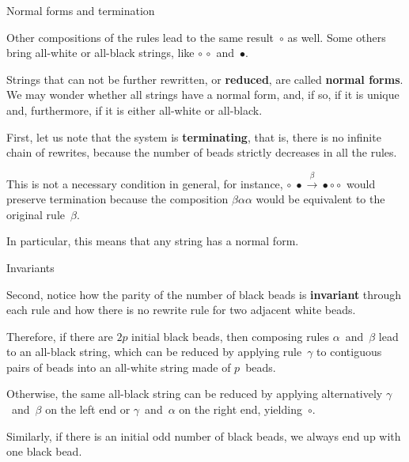 %
\begin{frame}{Normal forms and termination}

  \label{termination1}

  Other compositions of the rules lead to the same result~\(\circ\) as
  well. Some others bring all\hyp{}white or all\hyp{}black strings,
  like \(\circ \, \circ\) and~\(\bullet\).

  \bigskip

  Strings that can not be further rewritten, or \textbf{reduced}, are
  called \textbf{normal forms}. We may wonder whether all strings have
  a normal form, and, if so, if it is unique and, furthermore, if it
  is either all\hyp{}white or all\hyp{}black.

  \bigskip

  First, let us note that the system is \textbf{terminating}, that is,
  there is no infinite chain of rewrites, because the number of beads
  strictly decreases in all the rules.

  \bigskip

  This is not a necessary condition in general, for instance, \(\circ
  \; \bullet \xrightarrow{\beta} \bullet \circ \circ\) would preserve
  termination because the composition \(\beta\alpha\alpha\) would be
  equivalent to the original rule~\(\beta\).

  \bigskip

  In particular, this means that any string has a normal form.

\end{frame}

%
\begin{frame}{Invariants}

  Second, notice how the parity of the number of black beads is
  \textbf{invariant} through each rule and how there is no rewrite
  rule for two adjacent white beads.

  \bigskip

  Therefore, if there are \(2p\) initial black beads, then composing
  rules \(\alpha\)~and~\(\beta\) lead to an all\hyp{}black string,
  which can be reduced by applying rule~\(\gamma\) to contiguous pairs
  of beads into an all\hyp{}white string made of \(p\)~beads.

  \bigskip

  Otherwise, the same all\hyp{}black string can be reduced by applying
  alternatively \(\gamma\)~and~\(\beta\) on the left end or
  \(\gamma\)~and~\(\alpha\) on the right end, yielding~\(\circ\).

  \bigskip

  Similarly, if there is an initial odd number of black beads, we
  always end up with one black bead.

\end{frame}

